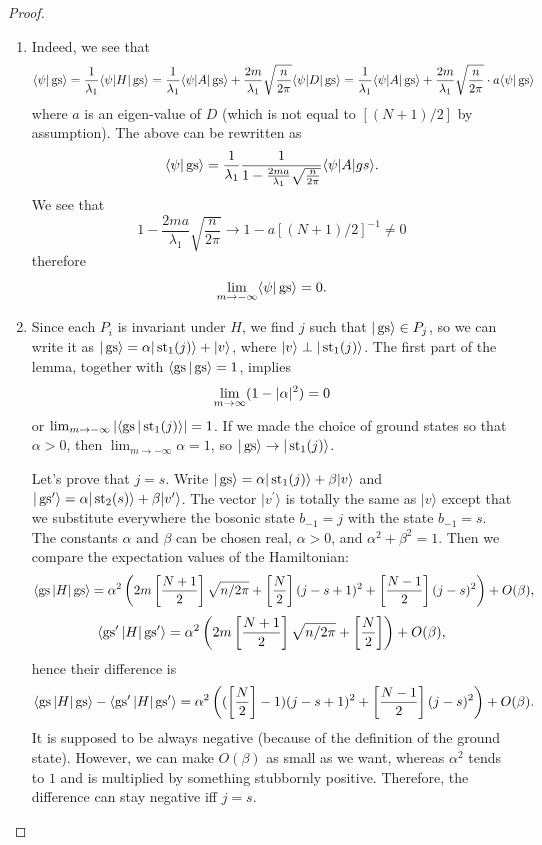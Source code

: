 \begin{proof}
\begin{enumerate}
\item Indeed, we see that
\[
\langle \psi | \operatorname{gs} \rangle = \frac{1}{\lambda_1} \langle \psi | H|\operatorname{gs}\rangle = \frac{1}{\lambda_1} \langle \psi |A|\operatorname{gs}\rangle + \frac{2m}{\lambda_1} \sqrt{\frac{n}{2\pi}} \langle \psi | D | \operatorname{gs} \rangle = \frac{1}{\lambda_1} \langle \psi |A|\operatorname{gs}\rangle + \frac{2m}{\lambda_1} \sqrt{\frac{n}{2\pi}} \cdot a \langle \psi | \operatorname{gs} \rangle
\]
where $a$ is an eigen-value of $D$ (which is not equal to $[(N+1)/2]$ by assumption). The above can be rewritten as
\[
\langle \psi | \operatorname{gs}\rangle = \frac{1}{\lambda_1} \frac{1}{1- \frac{2ma}{\lambda_1}\sqrt{\frac{n}{2\pi}} } \langle \psi | A | gs\rangle.
\]
We see that 
\[
1- \frac{2ma}{\lambda_1}\sqrt{\frac{n}{2\pi}} \rightarrow 1 - a [(N+1)/2]^{-1} \neq 0
\]
therefore
\[
\lim_{m \rightarrow -\infty}\langle \psi | \operatorname{gs} \rangle = 0.
\]
\item Since each $P_i$ is invariant under $H$, we find $j$ such that $|\operatorname{gs} \rangle \in P_j$, so we can write it as $|\operatorname{gs}\rangle = \alpha |\operatorname{st}_1(j)\rangle + |v\rangle$, where $|v\rangle \perp |\operatorname{st}_1(j)\rangle$. The first part of the lemma, together with $\langle \operatorname{gs} | \operatorname{gs} \rangle = 1$, implies
\[
\lim_{m \rightarrow \-\infty} (1 - |\alpha|^2) = 0
\]
or $\lim_{m \rightarrow -\infty} |\langle \operatorname{gs} |\operatorname{st}_1(j)\rangle| = 1$. If we made the choice of ground states so that $\alpha > 0$, then $\lim_{m\rightarrow -\infty} \alpha = 1$, so $|\operatorname{gs}\rangle \rightarrow |\operatorname{st}_1(j)\rangle$.

Let's prove that $j = s$. Write $|\operatorname{gs}\rangle = \alpha |\operatorname{st}_1(j)\rangle + \beta |v\rangle$ and $|\operatorname{gs}^\prime\rangle = \alpha |\operatorname{st}_2(s)\rangle + \beta |v^\prime \rangle$. The vector $|v^\prime \rangle$ is totally the same as $|v\rangle$ except that we substitute everywhere the bosonic state $b_{-1} = j$ with the state $b_{-1} = s$. The constants $\alpha$ and $\beta$ can be chosen real, $\alpha > 0$, and $\alpha^2+\beta^2 = 1$. Then we compare the expectation values of the Hamiltonian:
\[
\langle \operatorname{gs} | H|\operatorname{gs} \rangle  = \alpha^2 \left(2m\left[\frac{N+1}{2}\right] \sqrt{n/2\pi} + \left[\frac{N}{2}\right](j-s+1)^2 + \left[\frac{N-1}{2}\right] (j-s)^2 \right) + O(\beta),
\]
\[
\langle \operatorname{gs}^\prime | H|\operatorname{gs}^\prime \rangle  = \alpha^2 \left(2m\left[\frac{N+1}{2}\right] \sqrt{n/2\pi} + \left[\frac{N}{2}\right]\right) + O(\beta),
\]
hence their difference is
\[
\langle \operatorname{gs} | H|\operatorname{gs} \rangle - \langle \operatorname{gs}^\prime | H|\operatorname{gs}^\prime \rangle = \alpha^2\left((\left[\frac{N}{2}\right]-1)(j-s+1)^2 + \left[\frac{N-1}{2}\right] (j-s)^2\right) + O(\beta).
\]
It is supposed to be always negative (because of the definition of the ground state). However, we can make $O(\beta)$ as small as we want, whereas $\alpha^2$ tends to $1$ and is multiplied by something stubbornly positive. Therefore, the difference can stay negative iff $j = s$.
\end{enumerate}
\end{proof}

